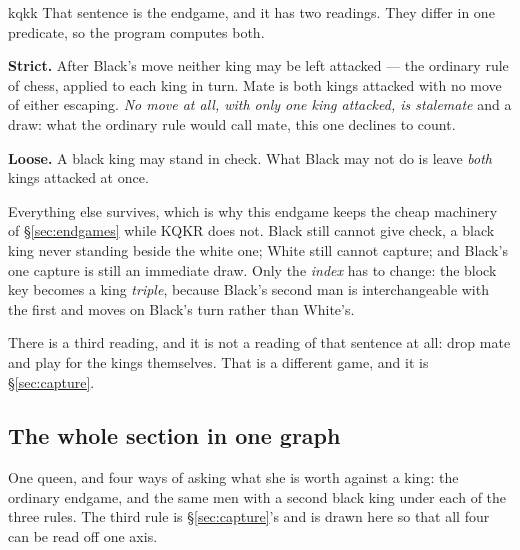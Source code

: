\documentclass[11pt]{article}
\begin{document}
\begin{result}[title={A mate counts only when both kings are mated at once}]{kqkk}
That sentence is the endgame, and it has two readings. They differ in one
predicate, so the program computes both.

\smallskip
\textbf{Strict.} After Black's move neither king may be left attacked --- the
ordinary rule of chess, applied to each king in turn. Mate is both kings
attacked with no move of either escaping. \emph{No move at all, with only one
king attacked, is stalemate} and a draw: what the ordinary rule would call
mate, this one declines to count.

\smallskip
\textbf{Loose.} A black king may stand in check. What Black may not do is leave
\emph{both} kings attacked at once.

\medskip
Everything else survives, which is why this endgame keeps the cheap machinery
of \S\ref{sec:endgames} while KQKR does not. Black still cannot give check, a black king never
standing beside the white one; White still cannot capture; and Black's one
capture is still an immediate draw. Only the \emph{index} has to change: the
block key becomes a king \emph{triple}, because Black's second man is
interchangeable with the first and moves on Black's turn rather than White's.

\smallskip
There is a third reading, and it is not a reading of that sentence at all: drop
mate and play for the kings themselves. That is a different game, and it is
\S\ref{sec:capture}.
\end{result}

\subsection{The whole section in one graph}\label{sub:kqkk-graph}

One queen, and four ways of asking what she is worth against a king: the
ordinary endgame, and the same men with a second black king under each of the
three rules. The third rule is \S\ref{sec:capture}'s and is drawn here so that all four can be
read off one axis.
\end{document}
